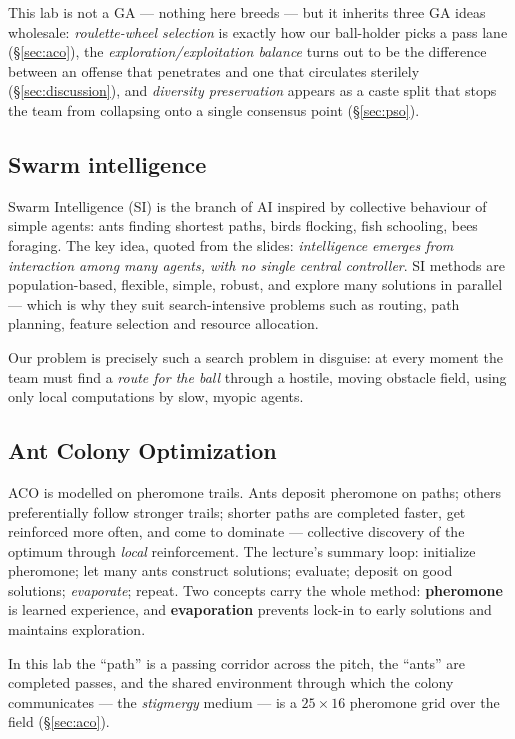 \documentclass[11pt,a4paper]{article}
\begin{document}
This lab is not a GA --- nothing here breeds --- but it inherits three GA ideas wholesale:
\emph{roulette-wheel selection} is exactly how our ball-holder picks a pass lane
(\S\ref{sec:aco}), the \emph{exploration/exploitation balance} turns out to be the difference
between an offense that penetrates and one that circulates sterilely
(\S\ref{sec:discussion}), and \emph{diversity preservation} appears as a caste split that stops
the team from collapsing onto a single consensus point (\S\ref{sec:pso}).

\subsection{Swarm intelligence}

Swarm Intelligence (SI) is the branch of AI inspired by collective behaviour of simple agents:
ants finding shortest paths, birds flocking, fish schooling, bees foraging. The key idea, quoted
from the slides: \emph{intelligence emerges from interaction among many agents, with no single
central controller}. SI methods are population-based, flexible, simple, robust, and explore many
solutions in parallel --- which is why they suit search-intensive problems such as routing,
path planning, feature selection and resource allocation.

Our problem is precisely such a search problem in disguise: at every moment the team must find a
\emph{route for the ball} through a hostile, moving obstacle field, using only local
computations by slow, myopic agents.

\subsection{Ant Colony Optimization}

ACO is modelled on pheromone trails. Ants deposit pheromone on paths; others preferentially
follow stronger trails; shorter paths are completed faster, get reinforced more often, and come
to dominate --- collective discovery of the optimum through \emph{local} reinforcement. The
lecture's summary loop: initialize pheromone; let many ants construct solutions; evaluate;
deposit on good solutions; \emph{evaporate}; repeat. Two concepts carry the whole method:
\textbf{pheromone} is learned experience, and \textbf{evaporation} prevents lock-in to early
solutions and maintains exploration.

In this lab the ``path'' is a passing corridor across the pitch, the ``ants'' are completed
passes, and the shared environment through which the colony communicates --- the
\emph{stigmergy} medium --- is a $25\times16$ pheromone grid over the field
(\S\ref{sec:aco}).
\end{document}
